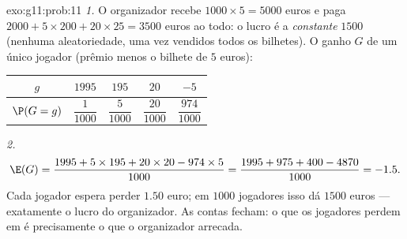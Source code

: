 \begin{solution}{exo:g11:prob:11}
\emph{1.} O organizador recebe $1000 \times 5 = 5000$ euros e paga
$2000 + 5 \times 200 + 20 \times 25 = 3500$ euros ao todo: o lucro é a
\emph{constante} $1500$ (nenhuma aleatoriedade, uma vez vendidos todos os
bilhetes). O ganho $G$ de um único jogador (prêmio menos o bilhete de
$5$ euros):
\begin{center}
\begin{tabular}{c|cccc}
$g$ & $1995$ & $195$ & $20$ & $-5$\\
\hline\rule{0pt}{11pt}%
$\P(G=g)$ & $\dfrac{1}{1000}$ & $\dfrac{5}{1000}$ & $\dfrac{20}{1000}$
& $\dfrac{974}{1000}$
\end{tabular}
\end{center}

\emph{2.}
\[
\E(G) = \frac{1995 + 5 \times 195 + 20 \times 20 - 974 \times 5}{1000}
= \frac{1995 + 975 + 400 - 4870}{1000} = -1.5 .
\]
Cada jogador espera perder $1.50$ euro; em $1000$ jogadores isso dá
$1500$ euros --- exatamente o lucro do organizador. As contas fecham: o
que os jogadores perdem em  é precisamente o que o organizador
arrecada.
\end{solution}

